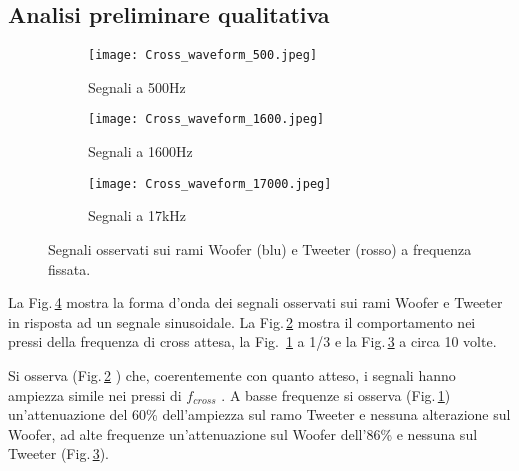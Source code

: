 \documentclass[../Relazione_circuiti]{subfiles}
\begin{document}
\subsection{Analisi preliminare qualitativa}

  \begin{figure}[H]
    \centering

    \begin{subfigure}[b]{0.3\textwidth}
      \centering
      \texttt{[image: Cross\_waveform\_500.jpeg]}

      \caption{Segnali a 500Hz}
      \label{fig:signal_500}

    \end{subfigure}
    \begin{subfigure}[b]{0.3\textwidth}
      \centering
      \texttt{[image: Cross\_waveform\_1600.jpeg]}

      \caption{Segnali a 1600Hz}
      \label{fig:signal_1600}

    \end{subfigure}
    \begin{subfigure}[b]{0.3\textwidth}
      \centering
      \texttt{[image: Cross\_waveform\_17000.jpeg]}

      \caption{Segnali a 17kHz}
      \label{fig:signal_17k}

    \end{subfigure}
    \hfill

    \caption{Segnali osservati sui rami Woofer (blu) e Tweeter (rosso)
      a frequenza fissata.}
    \label{fig:signal_waveforms}

  \end{figure}

  La Fig.\,\ref{fig:signal_waveforms}
  mostra la forma d'onda dei segnali osservati sui rami Woofer e Tweeter in risposta ad un segnale sinusoidale. La
  Fig.\,\ref{fig:signal_1600} mostra il comportamento nei pressi della frequenza di cross attesa, la Fig.\,
  \ref{fig:signal_500} a 1/3 e la Fig.\,\ref{fig:signal_17k} a circa 10 volte.

  Si osserva (Fig.\,\ref{fig:signal_1600}
  ) che, coerentemente con quanto atteso, i segnali hanno ampiezza simile nei pressi di $f_{cross}$
  . A basse frequenze si osserva (Fig.\,\ref{fig:signal_500}) un'attenuazione del 60\%
  dell'ampiezza sul ramo Tweeter e nessuna alterazione sul Woofer, ad alte frequenze un'attenuazione sul Woofer
  dell'86\% e nessuna sul Tweeter (Fig.\,\ref{fig:signal_17k}).
\end{document}
